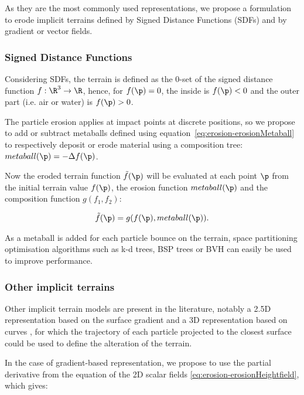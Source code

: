 As they are the most commonly used representations, we propose a formulation to erode implicit terrains defined by Signed Distance Functions (SDFs) and by gradient or vector fields.

\subsubsection{Signed Distance Functions}
\label{sec:erosion-application_on_sdf}

Considering SDFs, the terrain is defined as the 0-set of the signed distance function $f: \R^3 \to \R$, hence, for $f(\p) = 0$, the inside is $f(\p) < 0$ and the outer part (i.e. air or water) is $f(\p) > 0$. 

The particle erosion applies at impact points at discrete positions, so we propose to add or subtract metaballs defined using equation~\eqref{eq:erosion-erosionMetaball} to respectively deposit or erode material using a composition tree:
 $metaball(\p) = -\Delta f(\p)$.

Now the eroded terrain function $\Tilde{f}(\p)$ will be evaluated at each point $\p$ from the initial terrain value $f(\p)$, the erosion function $metaball(\p)$ and the composition function $g(f_1, f_2)$:

\begin{align}
    \Tilde{f}(\p) = g(f(\p), metaball(\p)).  \nonumber
\end{align}

As a metaball is added for each particle bounce on the terrain, space partitioning optimisation algorithms such as k-d trees, BSP trees or BVH can easily be used to improve performance.

\subsubsection{Other implicit terrains}
\label{sec:erosion-application_on_other_implicit}
Other implicit terrain models are present in the literature, notably a 2.5D representation based on the surface gradient \cite{Guerin2022} and a 3D representation based on curves \cite{Becher2017}, for which the trajectory of each particle projected to the closest surface could be used to define the alteration of the terrain.

In the case of gradient-based representation, we propose to use the partial derivative from the equation of the 2D scalar fields \eqref{eq:erosion-erosionHeightfield}, which gives:

